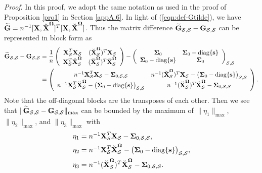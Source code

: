 \documentclass[11pt]{article}
\newcommand{\bs}{\mbox{\bf s}}
\newcommand{\bG}{\mbox{\bf G}}
\newcommand{\bX}{\mbox{\bf X}}
\newcommand{\bSig}{\mbox{\boldmath $\Sigma$}}
\newcommand{\sbOmg}{\mbox{\scriptsize\boldmath $\Omega$}}
\newcommand{\diag}{\mathrm{diag}}
\begin{document}
\noindent \textit{Proof}. In this proof, we adopt the same notation as used in the proof of Proposition \ref{pro1} in Section \ref{appA.6}. In light of  (\ref{eqn:def-Gtilde}), we have $\widetilde{\bG} = n^{-1} [\bX, \breve{\bX}^{\sbOmg}]^{T}[\bX, \breve{\bX}^{\sbOmg}]$. Thus
the matrix difference $\widetilde{\bG}_{\mathcal{S},\mathcal{S}} - \bG_{\mathcal{S},\mathcal{S}} $ can be represented in block form as
\begin{align*}
\widetilde{\bG}_{\mathcal{S},\mathcal{S}} - \bG_{\mathcal{S},\mathcal{S}}
& =
\dfrac{1}{n}
\left(\begin{array}{cc}
\bX^{T}_{\mathcal S} \bX_{\mathcal S} & (\breve{\bX}_{\mathcal S}^{\sbOmg})^{T} \bX_{\mathcal S}  \\
\bX_{\mathcal S}^{T}\breve{\bX}_{\mathcal S}^{\sbOmg} & (\breve{\bX}_{\mathcal S}^{\sbOmg})^{T} \breve{\bX}_{\mathcal S}^{\sbOmg}
\end{array}\right)
-
\left(\begin{array}{cc}
\bSig_0 & \bSig_0 - \diag\{\bs\} \\
\bSig_0 - \diag\{\bs\} & \bSig_0
\end{array} \right)
_{\mathcal{S},\mathcal{S}}
\\
& =
\left(\begin{array}{cc}
n^{-1} \bX^{T}_{\mathcal S} \bX_{\mathcal S}
- \bSig_{0, \mathcal{S}, \mathcal{S}}
& n^{-1} (\breve{\bX}_{\mathcal S}^{\sbOmg})^{T} \bX_{\mathcal S}
- \big(\bSig_0 - \diag\{\bs\}\big)_{\mathcal{S},\mathcal{S}}
\\
n^{-1} \bX_{\mathcal S}^{T}\breve{\bX}_{\mathcal S}^{\sbOmg}
- \big(\bSig_0 - \diag\{\bs\}\big)_{\mathcal{S},\mathcal{S}}
& n^{-1} (\breve{\bX}_{\mathcal S}^{\sbOmg})^{T} \breve{\bX}_{\mathcal S}^{\sbOmg} - \bSig_{0, \mathcal{S}, \mathcal{S}}
\end{array}\right).
\end{align*}
Note that the off-diagonal blocks are the transposes of each other. Then we see that
$ \| \widetilde{\bG}_{\mathcal{S}, \mathcal{S}} - \bG_{\mathcal{S}, \mathcal{S}} \|_{\max} $ can be bounded by the maximum of $\|\eta_1\|_{\max}$, $\|\eta_2\|_{\max}$, and $\|\eta_3\|_{\max}$ with
\begin{align*}
\eta_1 & = n^{-1} \bX^{T}_{\mathcal S} \bX_{\mathcal S}
- \bSig_{0, \mathcal{S}, \mathcal{S}} , \\
\eta_2 & = n^{-1} \bX_{\mathcal S}^{T}\breve{\bX}_{\mathcal S}^{\sbOmg}
- \big(\bSig_0 - \diag\{\bs\}\big)_{\mathcal{S},\mathcal{S}} , \\
\eta_3 & = n^{-1} (\breve{\bX}_{\mathcal S}^{\sbOmg})^{T} \breve{\bX}_{\mathcal S}^{\sbOmg} - \bSig_{0, \mathcal{S}, \mathcal{S}}.
\end{align*}
\end{document}
